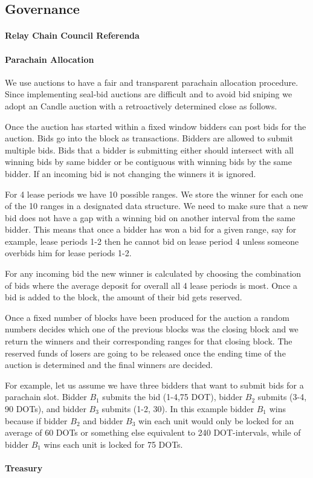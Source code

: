 \subsection{Governance}\label{sec:governance}
 \paragraph{Relay Chain Council Referenda}
 \paragraph{Parachain Allocation}
We use auctions to have a fair and transparent parachain allocation procedure.
Since implementing seal-bid auctions are difficult and to avoid bid sniping we adopt an Candle auction \cite{Fuellbrunn:2012:CandleAuction} with a retroactively determined close as follows.

Once the auction has started within a fixed window bidders can post bids for the auction.
Bids go into the block as transactions.
Bidders are allowed to submit multiple bids.
Bids that a bidder is submitting either should intersect with all winning bids by same bidder or be contiguous with winning bids by the same bidder.
If an incoming bid is not changing the winners it is ignored.

For 4 lease periods we have 10 possible ranges.
We store the winner for each one of the 10 ranges in a designated data structure.
We need to make sure that a new bid does not have a gap with a winning bid on another interval from the same bidder.
This means that once a bidder has won a bid for a given range, say for example, lease periods 1-2 then he cannot bid on lease period 4 unless someone overbids him for lease periods 1-2.

For any incoming bid the new winner is calculated by choosing the combination of bids where the average deposit for overall all 4 lease periods is most.
Once a bid is added to the block, the amount of their bid gets reserved.

Once a fixed number of blocks have been produced for the auction a random numbers decides which one of the previous blocks was the closing block and we return the winners and their corresponding ranges for that closing block.
The reserved funds of losers are going to be released once the ending time of the auction is determined and the final winners are decided.

For example, let us assume we have three bidders that want to submit bids for a parachain slot.
Bidder $B_1$ submits the bid (1-4,75 DOT), bidder $B_2$ submits (3-4, 90 DOTs), and bidder $B_3$ submits (1-2, 30).
In this example bidder $B_1$ wins because if bidder $B_2$ and bidder $B_3$ win each unit would only be locked for an average of 60 DOTs or something else equivalent to 240 DOT-intervals, while of bidder $B_1$ wins each unit is locked for 75 DOTs.

 \paragraph{Treasury}

